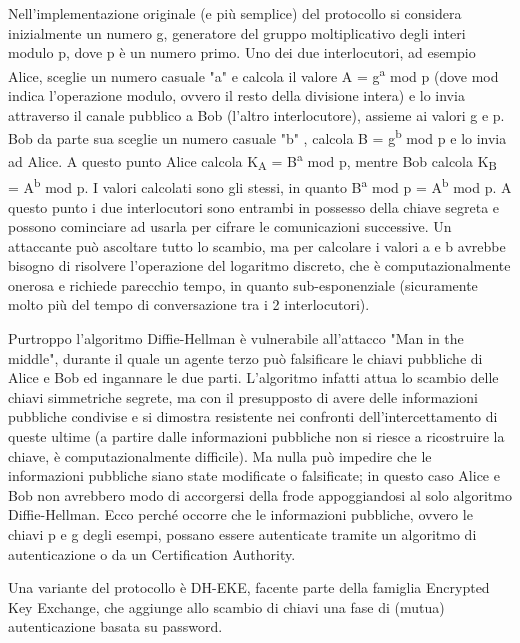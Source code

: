 \vspace{5mm}

Nell'implementazione originale (e più semplice) del protocollo si considera inizialmente un numero g, generatore del gruppo moltiplicativo degli interi modulo p, dove p è un numero primo. Uno dei due interlocutori, ad esempio Alice, sceglie un numero casuale "a" e calcola il valore A = g\textsuperscript{a} mod p (dove mod indica l'operazione modulo, ovvero il resto della divisione intera) e lo invia attraverso il canale pubblico a Bob (l'altro interlocutore), assieme ai valori g e p. Bob da parte sua sceglie un numero casuale "b" , calcola B = g\textsuperscript{b} mod p e lo invia ad Alice. A questo punto Alice calcola K\textsubscript{A} = B\textsuperscript{a} mod p, mentre Bob calcola K\textsubscript{B} = A\textsuperscript{b} mod p.
I valori calcolati sono gli stessi, in quanto B\textsuperscript{a} mod p = A\textsuperscript{b} mod p.
A questo punto i due interlocutori sono entrambi in possesso della chiave segreta e possono cominciare ad usarla per cifrare le comunicazioni successive.
Un attaccante può ascoltare tutto lo scambio, ma per calcolare i valori a e b avrebbe bisogno di risolvere l'operazione del logaritmo discreto, che è computazionalmente onerosa e richiede parecchio tempo, in quanto sub-esponenziale (sicuramente molto più del tempo di conversazione tra i 2 interlocutori).

\vspace{5mm}

Purtroppo l'algoritmo Diffie-Hellman è vulnerabile all'attacco "Man in the middle", durante il quale un agente terzo può falsificare le chiavi pubbliche di Alice e Bob ed ingannare le due parti. L'algoritmo infatti attua lo scambio delle chiavi simmetriche segrete, ma con il presupposto di avere delle informazioni pubbliche condivise e si dimostra resistente nei confronti dell'intercettamento di queste ultime (a partire dalle informazioni pubbliche non si riesce a ricostruire la chiave, è computazionalmente difficile). Ma nulla può impedire che le informazioni pubbliche siano state modificate o falsificate; in questo caso Alice e Bob non avrebbero modo di accorgersi della frode appoggiandosi al solo algoritmo Diffie-Hellman. Ecco perché occorre che le informazioni pubbliche, ovvero le chiavi p e g degli esempi, possano essere autenticate tramite un algoritmo di autenticazione o da un Certification Authority.

Una variante del protocollo è DH-EKE, facente parte della famiglia Encrypted Key Exchange, che aggiunge allo scambio di chiavi una fase di (mutua) autenticazione basata su password.

